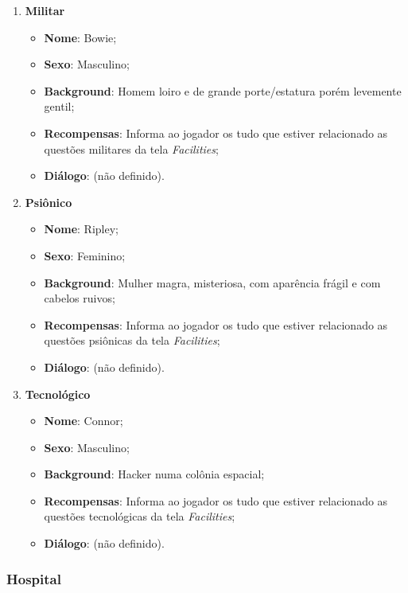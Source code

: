 \documentclass[11pt]{article} %
\begin{document}
\begin{enumerate}
  \item \textbf{Militar}
    \begin{itemize}
    \item \textbf{Nome}: Bowie;
    \item \textbf{Sexo}: Masculino;
    \item \textbf{Background}: Homem loiro e de grande porte/estatura porém levemente gentil;
    \item \textbf{Recompensas}: Informa ao jogador os tudo que estiver relacionado as questões militares da tela \textit{Facilities};
    \item \textbf{Diálogo}: (não definido).
  \end{itemize}

  \item \textbf{Psiônico}
    \begin{itemize}
    \item \textbf{Nome}: Ripley;
    \item \textbf{Sexo}: Feminino;
    \item \textbf{Background}: Mulher magra, misteriosa, com aparência frágil e com cabelos ruivos;
    \item \textbf{Recompensas}: Informa ao jogador os tudo que estiver relacionado as questões psiônicas da tela \textit{Facilities};
    \item \textbf{Diálogo}: (não definido).
  \end{itemize}

  \item \textbf{Tecnológico}
    \begin{itemize}
    \item \textbf{Nome}: Connor;
    \item \textbf{Sexo}: Masculino;
    \item \textbf{Background}: Hacker numa colônia espacial;
    \item \textbf{Recompensas}: Informa ao jogador os tudo que estiver relacionado as questões tecnológicas da tela \textit{Facilities};
    \item \textbf{Diálogo}: (não definido).
  \end{itemize}
\end{enumerate}

\subsubsection{Hospital}
\end{document}
